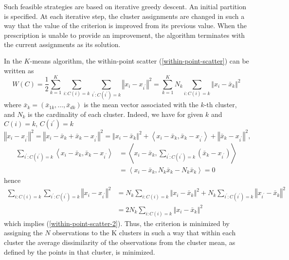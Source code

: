 \documentclass[11pt,twoside]{article}%
\theoremstyle{change}
\begin{document}
Such feasible strategies are based on iterative greedy descent. An initial
partition is specified. At each iterative step, the cluster assignments are
changed in such a way that the value of the criterion is improved from its
previous value. When the prescription is unable to provide an improvement, the
algorithm terminates with the current assignments as its solution.

In the $K$-means algorithm, the within-point scatter
(\ref{within-point-scatter}) can be written as
\begin{equation}
W(C)=\frac{1}{2}\sum_{k=1}^{K}\sum_{i:C(i)=k}\sum_{i^{\prime}:C(i^{\prime}%
)=k}\left\Vert x_{i}-x_{i^{\prime}}\right\Vert ^{2}=\sum_{k=1}^{K}N_{k}%
\sum_{i:C(i)=k}\left\Vert x_{i}-\bar{x}_{k}\right\Vert ^{2}%
\label{within-point-scatter-2}%
\end{equation}
where $\bar{x}_{k}=\left(  \bar{x}_{1k},\ldots,\bar{x}_{dk}\right)  $ is the
mean vector associated with the $k$-th cluster, and $N_{k}$ is the cardinality
of each cluster. Indeed, we have for given $k$ and $C(i)=k$, $C(i^{\prime})=k$%
\[
\left\Vert x_{i}-x_{i^{\prime}}\right\Vert ^{2}=\left\Vert x_{i}-\bar{x}%
_{k}+\bar{x}_{k}-x_{i^{\prime}}\right\Vert ^{2}=\left\Vert x_{i}-\bar{x}%
_{k}\right\Vert ^{2}+\left\langle x_{i}-\bar{x}_{k},\bar{x}_{k}-x_{i^{\prime}%
}\right\rangle +\left\Vert \bar{x}_{k}-x_{i^{\prime}}\right\Vert ^{2},
\]%
\begin{align*}
\sum_{i^{\prime}:C(i^{\prime})=k}\left\langle x_{i}-\bar{x}_{k},\bar{x}%
_{k}-x_{i^{\prime}}\right\rangle  & =\left\langle x_{i}-\bar{x}_{k}%
,\sum_{i^{\prime}:C(i^{\prime})=k}\left(  \bar{x}_{k}-x_{i^{\prime}}\right)
\right\rangle \\
& =\left\langle x_{i}-\bar{x}_{k},N_{k}\bar{x}_{k}-N_{k}\bar{x}_{k}%
\right\rangle =0
\end{align*}
hence
\begin{align*}
\sum_{i:C(i)=k}\sum_{i^{\prime}:C(i^{\prime})=k}\left\Vert x_{i}-x_{i^{\prime
}}\right\Vert ^{2}  & =N_{k}\sum_{i:C(i)=k}\left\Vert x_{i}-\bar{x}%
_{k}\right\Vert ^{2}+N_{k}\sum_{i^{\prime}:C(i^{\prime})=k}\left\Vert
x_{i^{\prime}}-\bar{x}_{k}\right\Vert ^{2}\\
& =2N_{k}\sum_{i:C(i)=k}\left\Vert x_{i}-\bar{x}_{k}\right\Vert ^{2}%
\end{align*}
which implies (\ref{within-point-scatter-2}). Thus, the criterion is minimized
by assigning the $N$ observations to the K clusters in such a way that within
each cluster the average dissimilarity of the observations from the cluster
mean, as defined by the points in that cluster, is minimized.
\end{document}
